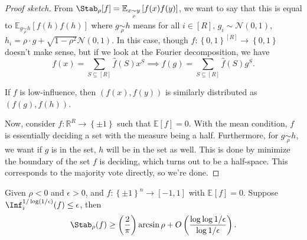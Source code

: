 \begin{proof}[Proof sketch]
	From \(\Stab_\rho [f] = \mathbb{E}_{x \underset{\rho }{\sim } y}\left[f(x) f(y) \right] \), we want to say that this is equal to \(\mathbb{E}_{g \underset{\rho }{\sim } h}\left[ f(h) f(h) \right] \) where \(g \underset{\rho }{\sim } h\) means for all \(i\in [R]\), \(g_i \sim \mathcal{N} (0, 1)\), \(h_i = \rho \cdot g + \sqrt{1 - \rho ^{2} }\mathcal{N} (0, 1) \). In this case, though \(f\colon \left\{ 0, 1 \right\} ^{[R]} \to \left\{ 0, 1 \right\} \) doesn't make sense, but if we look at the Fourier decomposition, we have
	\[
		f(x) = \sum_{S \subseteq [R]} \hat{f} (S) x^S \implies f(g) = \sum_{S \subseteq [R]} \hat{f} (S) g^S.
	\]

	\begin{remark}
		If \(f\) is low-influence, then \((f(x), f(y))\) is similarly distributed as \((f(g), f(h))\).
	\end{remark}
	Now, consider \(f\colon \mathbb{R} ^R \to \left\{ \pm 1 \right\} \) such that \(\mathbb{E}\left[f \right] =0\). With the mean condition, \(f\) is essentially deciding a set with the measure being a half. Furthermore, for \(g \underset{\rho }{\sim } h\), we want if \(g\) is in the set, \(h\) will be in the set as well. This is done by minimize the boundary of the set \(f\) is deciding, which turns out to be a half-space. This corresponds to the majority vote directly, so we're done.
\end{proof}

\begin{corollary}
	Given \(\rho < 0\) and \(\epsilon > 0\), and \(f\colon \left\{ \pm 1 \right\} ^n \to [-1, 1]\) with \(\mathbb{E}_{}\left[f \right] = 0\). Suppose \(\Inf_i^{1 / \log (1 / \epsilon )}(f)\leq \epsilon \), then
	\[
		\Stab_\rho (f) \geq \left( \frac{2}{\pi } \right) \arcsin \rho + O\left( \frac{\log \log 1 / \epsilon }{\log 1 / \epsilon } \right).
	\]
\end{corollary}

